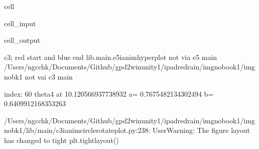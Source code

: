 \documentclass[letterpaper,10pt,english]{jupyterBook}
\begin{document}
\begin{sphinxuseclass}{cell}\begin{sphinxVerbatimInput}

\begin{sphinxuseclass}{cell_input}
\begin{sphinxVerbatim}[commandchars=\\\{\}]
 
 
   
\end{sphinxVerbatim}

\end{sphinxuseclass}\end{sphinxVerbatimInput}
\begin{sphinxVerbatimOutput}

\begin{sphinxuseclass}{cell_output}
\begin{sphinxVerbatim}[commandchars=\\\{\}]
c3; red start and blue end
lib.main.e5\PYGZus{}i\PYGZus{}anim\PYGZus{}hyperplot
not via e5 main
/Users/ngcchk/Documents/Github/gpd2\PYGZhy{}win\PYGZhy{}unity1/ipadred\PYGZhy{}rain/imgno\PYGZus{}book1/imgnobk1
not vai c3 main

index: 60 
theta4 at  10.120566937738932 
 a= \PYGZhy{}0.7675482134302494  b= \PYGZhy{}0.6409912168353263 
\end{sphinxVerbatim}

\begin{sphinxVerbatim}[commandchars=\\\{\}]
/Users/ngcchk/Documents/Github/gpd2\PYGZhy{}win\PYGZhy{}unity1/ipadred\PYGZhy{}rain/imgno\PYGZus{}book1/imgnobk1/lib/main/c3\PYGZus{}i\PYGZus{}anim\PYGZus{}circle\PYGZus{}rotate\PYGZus{}plot.py:238: UserWarning: The figure layout has changed to tight
  plt.tight\PYGZus{}layout()
\end{sphinxVerbatim}

\noindent{}

\end{sphinxuseclass}\end{sphinxVerbatimOutput}

\end{sphinxuseclass}
\end{document}
